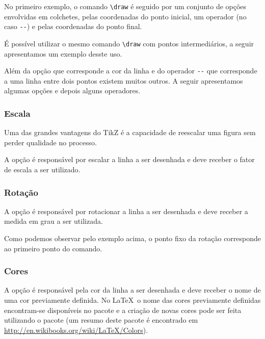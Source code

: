 No primeiro exemplo, o comando \lstinline!\draw! é seguido por um conjunto de opções envolvidas em colchetes, pelas coordenadas do ponto inicial, um operador (no caso \lstinline!--!) e pelas coordenadas do ponto final.

É possível utilizar o mesmo comando \lstinline!\draw! com pontos intermediários, a seguir apresentamos um exemplo desste uso. \\

Além da opção  que corresponde a cor da linha e do operador \lstinline!--! que corresponde a uma linha entre dois pontos existem muitos outros. A seguir apresentamos algumas opções e depois alguns operadores.

\subsubsection{Escala}
Uma das grandes vantagens do TikZ é a capacidade de reescalar uma figura sem perder qualidade no processo.

A opção  é responsável por escalar a linha a ser desenhada e deve receber o fator de escala a ser utilizado. \\

\subsubsection{Rotação}
A opção  é responsável por rotacionar a linha a ser desenhada e deve receber a medida em grau a ser utilizada. \\

Como podemos observar pelo exemplo acima, o ponto fixo da rotação corresponde ao primeiro ponto do comando.

\subsubsection{Cores}
A opção  é responsável pela cor da linha a ser desenhada e deve receber o nome de uma cor previamente definida. No \LaTeX \, o nome das cores previamente definidas encontram-se disponíveis no pacote  e a criação de novas cores pode ser feita utilizando o pacote  (um resumo deste pacote é encontrado em \url{http://en.wikibooks.org/wiki/LaTeX/Colors}). \\

